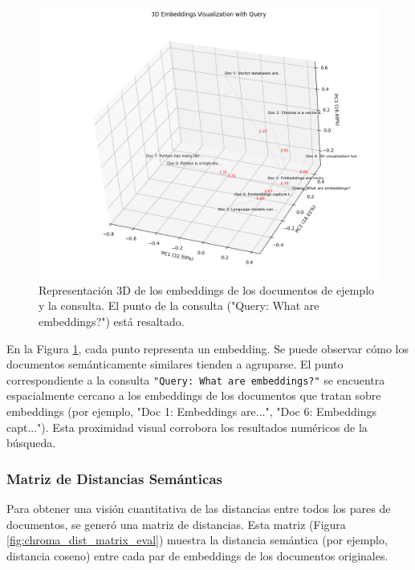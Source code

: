 \begin{figure}[H]
\centering
\includegraphics[width=\textwidth]{archivos/chroma_3d.png}
\caption[Visualización 3D de Embeddings con ChromaDB]{Representación 3D de los embeddings de los documentos de ejemplo y la consulta. El punto de la consulta ("Query: What are embeddings?") está resaltado.}
\label{fig:chroma_3d_eval}
\end{figure}

En la Figura \ref{fig:chroma_3d_eval}, cada punto representa un embedding. Se puede observar cómo los documentos semánticamente similares tienden a agruparse. El punto correspondiente a la consulta \texttt{"Query: What are embeddings?"} se encuentra espacialmente cercano a los embeddings de los documentos que tratan sobre embeddings (por ejemplo, "Doc 1: Embeddings are...", "Doc 6: Embeddings capt..."). Esta proximidad visual corrobora los resultados numéricos de la búsqueda.

\subsubsection{Matriz de Distancias Semánticas}
Para obtener una visión cuantitativa de las distancias entre todos los pares de documentos, se generó una matriz de distancias. Esta matriz (Figura \ref{fig:chroma_dist_matrix_eval}) muestra la distancia semántica (por ejemplo, distancia coseno) entre cada par de embeddings de los documentos originales.

